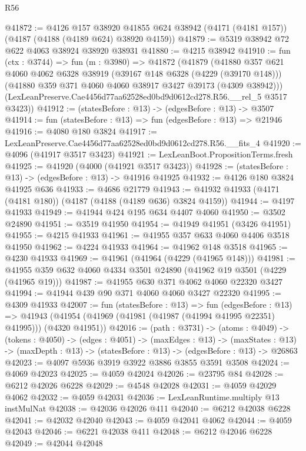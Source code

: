 \begin{lexlean}{R56}
\begin{coremodule}
@41872 := @4126
    @157
    @38920
    @41855
    @624
    @38942
    (@4171 (@4181 @157))
    (@4187 (@4188 (@4189 @624) @38920 @4159))
@41879 := @5319 @38942 @72 @622 @4063 @38924 @38920 @38931
@41880 := @4215 @38942
@41910 := fun (ctx : @3744) =>
  fun (m : @3980) =>
  @41872
    (@41879
      (@41880
        @357
        @621
        @4060
        @4062
        @6328
        @38919
        (@39167 @148 @6328 (@4229 (@39170 @148)))
        (@41880 @359 @371 @4060 @4060 @38917 @3427 @39173 (@4309 @38942)))
      (LexLeanPreserve.Cae4456d77aa62528ed0bd9d0612cd278.R56.__rel_5 @3517 @3423))
@41912 := (statesBefore : @13) -> (edgesBefore : @13) -> @3507
@41914 := fun (statesBefore : @13) => fun (edgesBefore : @13) => @21946
@41916 := @4080 @180 @3824
@41917 := LexLeanPreserve.Cae4456d77aa62528ed0bd9d0612cd278.R56.__fits_4
@41920 := @4096 (@41917 @3517 @3423)
@41921 := LexLeanBoot.PropositionTerms.fresh
@41925 := @41920 (@4000 (@41921 @3517 @3423))
@41928 := (statesBefore : @13) -> (edgesBefore : @13) -> @41916 @41925
@41932 := @4126 @180 @3824 @41925 @636
@41933 := @4686 @21779
@41943 := @41932 @41933 (@4171 (@4181 @180)) (@4187 (@4188 (@4189 @636) @3824 @4159))
@41944 := @4197 @41933
@41949 := @41944 @424 @195 @634 @4407 @4060
@41950 := @3502 @24890
@41951 := @3519 @41950
@41954 := @41949 @41951 (@3426 @41951)
@41955 := @4215 @41933
@41961 := @41955 @357 @633 @4060 @4406 @3518 @41950
@41962 := @4224 @41933
@41964 := @41962 @148 @3518
@41965 := @4230 @41933
@41969 := @41961 (@41964 (@4229 (@41965 @148)))
@41981 := @41955 @359 @632 @4060 @4334 @3501 @24890 (@41962 @19 @3501 (@4229 (@41965 @19)))
@41987 := @41955 @630 @371 @4062 @4060 @22320 @3427
@41994 := @41944 @439 @90 @371 @4060 @4060 @3427 @22320
@41995 := @4309 @41933
@42007 := fun (statesBefore : @13) =>
  fun (edgesBefore : @13) =>
  @41943 (@41954 (@41969 (@41981 (@41987 (@41994 @41995 @22351) @41995))) (@4320 @41951))
@42016 := (path : @3731) ->
  (atoms : @4049) ->
  (tokens : @4050) ->
  (edges : @4051) ->
  (maxEdges : @13) ->
  (maxStates : @13) -> (maxDepth : @13) -> (statesBefore : @13) -> (edgesBefore : @13) -> @26863
@42023 := @4097 @5936 @3919 @3922 @3886 @3855 @3591 @3508
@42024 := @4069 @42023
@42025 := @4059 @42024
@42026 := @23795 @84
@42028 := @6212 @42026 @6228
@42029 := @4548 @42028
@42031 := @4059 @42029 @4062
@42032 := @4059 @42031
@42036 := LexLeanRuntime.multiply @13 instMulNat
@42038 := @42036 @42026 @411
@42040 := @6212 @42038 @6228
@42041 := @42032 @42040
@42043 := @4059 @42041 @4062
@42044 := @4059 @42043
@42046 := @6221 @42038 @411
@42048 := @6212 @42046 @6228
@42049 := @42044 @42048

\end{coremodule}
\end{lexlean}
